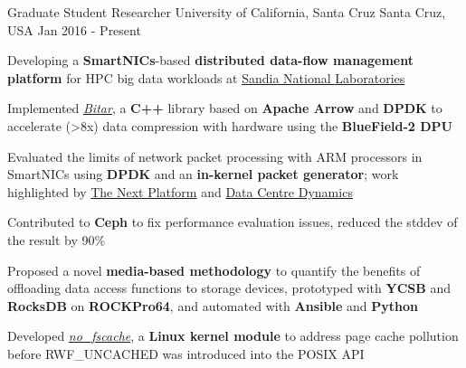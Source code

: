 

\begin{cventries}

  \cventry
    {Graduate Student Researcher} %
    {University of California, Santa Cruz} %
    {Santa Cruz, USA} %
    {Jan 2016 - Present} %
    {
      \begin{cvitems} %
        \item {Developing a \textbf{SmartNICs}-based \textbf{distributed data-flow management platform} for HPC big data workloads at \href{https://www.sandia.gov/}{Sandia National Laboratories}}
        \item {Implemented \href{https://github.com/ljishen/bitar}{\textit{Bitar}}, a \textbf{C++} library based on \textbf{Apache Arrow} and \textbf{DPDK} to accelerate (\textgreater 8x) data compression with hardware using the \textbf{BlueField-2 DPU}}
        \item {Evaluated the limits of network packet processing with ARM processors in SmartNICs using \textbf{DPDK} and an \textbf{in-kernel packet generator}; work highlighted by \href{https://www.nextplatform.com/2021/05/24/testing-the-limits-of-the-bluefield-2-smartnic/}{The Next Platform} and \href{https://www.datacenterdynamics.com/en/news/intel-pitches-infrastructure-processing-unit-as-new-data-center-dpu/}{Data Centre Dynamics}}
        \item {Contributed to \textbf{Ceph} to fix performance evaluation issues, reduced the stddev of the result by 90\%}
        \item {Proposed a novel \textbf{media-based methodology} to quantify the benefits of offloading data access functions to storage devices, prototyped with \textbf{YCSB} and \textbf{RocksDB} on \textbf{ROCKPro64}, and automated with \textbf{Ansible} and \textbf{Python}}
        \item {Developed \href{https://github.com/ljishen/nofscache}{\textit{no\_fscache}}, a \textbf{Linux kernel module} to address page cache pollution before RWF\_UNCACHED was introduced into the POSIX API}
      \end{cvitems}
    }


\end{cventries}
